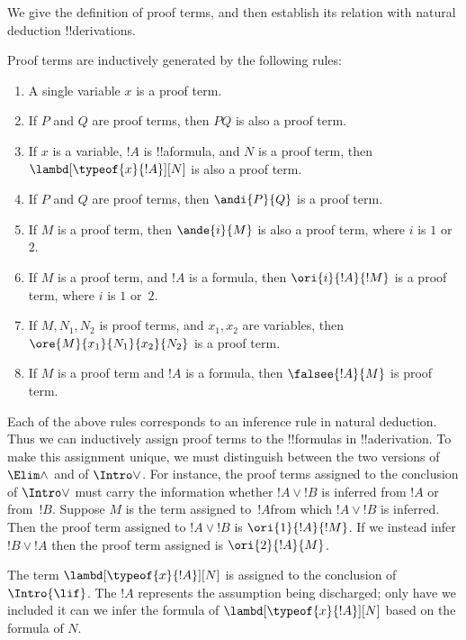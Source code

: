 \documentclass[../../../include/open-logic-section]{subfiles}
\begin{document}

We give the definition of proof terms, and then establish its relation
with natural deduction !!{derivation}s.

\begin{defn}
  Proof terms are inductively generated by the following rules:
  \begin{enumerate}
  \item A single variable $x$ is a proof term.
  \item If $P$ and $Q$ are proof terms, then $PQ$ is also a proof
    term.
  \item If $x$ is a variable, $!A$ is !!a{formula}, and $N$ is a proof
    term, then $\lambd[\typeof{x}{!A}][N]$ is also a proof term.
  \item If $P$ and $Q$ are proof terms, then $\andi{P}{Q}$ is a proof
    term.
  \item If $M$ is a proof term, then $\ande{i}{M}$ is also a proof
    term, where $i$ is $1$ or~$2$.
  \item If $M$ is a proof term, and $!A$ is a formula, then
    $\ori{i}{!A}{!M}$ is a proof term, where $i$ is $1$ or~$2$.
  \item If $M, N_1, N_2$ is proof terms, and $x_1, x_2$ are variables,
    then $\ore{M}{x_1}{N_1}{x_2}{N_2}$ is a proof term.
  \item If $M$ is a proof term and $!A$ is a formula, then
    $\falsee{!A}{M}$ is proof term.
  \end{enumerate}
\end{defn}

Each of the above rules corresponds to an inference rule in natural
deduction.  Thus we can inductively assign proof terms to the
!!{formula}s in !!a{derivation}.  To make this assignment unique, we
must distinguish between the two versions of $\Elim\land$ and of
$\Intro\lor$.  For instance, the proof terms assigned to the
conclusion of $\Intro\lor$ must carry the information whether $!A \lor
!B$ is inferred from $!A$ or from~$!B$. Suppose $M$ is the term
assigned to~$!A$from which $!A \lor !B$ is inferred. Then the proof
term assigned to $!A \lor !B$ is $\ori{1}{!A}{!M}$. If we instead
infer $!B \lor !A$ then the proof term assigned is $\ori{2}{!A}{M}$.

The term $\lambd[\typeof{x}{!A}][N]$ is assigned to the conclusion of
$\Intro{\lif}$. The $!A$ represents the assumption being discharged;
only have we included it can we infer the formula of
$\lambd[\typeof{x}{!A}][N]$ based on the formula of $N$.
\end{document}
